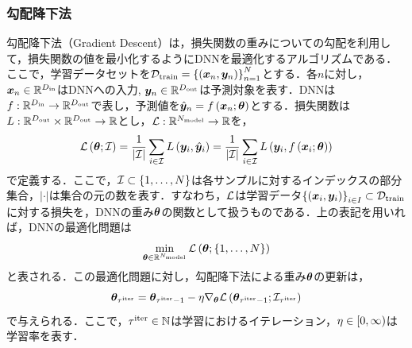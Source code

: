 \subsubsection{勾配降下法}
\label{sec3:sec:gradient_descent}
勾配降下法（Gradient Descent）は，損失関数の重みについての勾配を利用して，損失関数の値を最小化するようにDNNを最適化するアルゴリズムである．ここで，学習データセットを$\mathcal{D}_{\text{train}} = \left\{\left(\bm{x}_{n}, \bm{y}_{n}\right)\right\}_{n = 1}^{N}$とする．各$n$に対し，$\bm{x}_{n} \in \mathbb{R}^{D_{\text{in}}}$はDNNへの入力, $\bm{y}_{n} \in \mathbb{R}^{D_{\text{out}}}$は予測対象を表す．DNNは$f: \mathbb{R}^{D_{\text{in}}} \to \mathbb{R}^{D_{\text{out}}}$で表し，予測値を$\hat{\bm{y}}_{n} = f\left(\bm{x}_{n}; \bm{\theta}\right)$とする．損失関数は$L: \mathbb{R}^{D_{\text{out}}} \times \mathbb{R}^{D_{\text{out}}} \to \mathbb{R}$とし，$\mathcal{L}: \mathbb{R}^{N_{\text{model}}} \to \mathbb{R}$を，
\begin{equation}
    \mathcal{L}\left(\bm{\theta}; \mathcal{I}\right) = \frac{1}{|\mathcal{I}|} \sum_{i \in \mathcal{I}} L\left(\bm{y}_{i}, \hat{\bm{y}}_{i}\right) = \frac{1}{|\mathcal{I}|} \sum_{i \in \mathcal{I}} L\left(\bm{y}_{i}, f\left(\bm{x}_{i}; \bm{\theta}\right)\right)
\end{equation}
で定義する．ここで，$\mathcal{I} \subset \{1, \ldots, N\}$は各サンプルに対するインデックスの部分集合，$|\cdot|$は集合の元の数を表す．すなわち，$\mathcal{L}$は学習データ$\left\{\left(\bm{x}_{i}, \bm{y}_{i}\right)\right\}_{i \in I} \subset \mathcal{D}_{\text{train}}$に対する損失を，DNNの重み$\bm{\theta}$の関数として扱うものである．上の表記を用いれば，DNNの最適化問題は
\begin{equation}
    \min_{\bm{\theta} \in \mathbb{R}^{N_{\text{model}}}} \mathcal{L}\left(\bm{\theta}; \{1, \ldots, N\}\right)
\end{equation}
と表される．この最適化問題に対し，勾配降下法による重み$\bm{\theta}$の更新は，
\begin{equation}
    \label{sec3:eq:normal_gradient_descent}
    \bm{\theta}_{\tau^{\text{iter}}} = \bm{\theta}_{\tau^{\text{iter}} - 1} - \eta \nabla_{\bm{\theta}} \mathcal{L}\left(\bm{\theta}_{\tau^{\text{iter}} - 1}; \mathcal{I}_{\tau^{\text{iter}}}\right)
\end{equation}
で与えられる．ここで，$\tau^{\text{iter}} \in \mathbb{N}$は学習におけるイテレーション，$\eta \in \left[0, \infty\right)$は学習率を表す．

